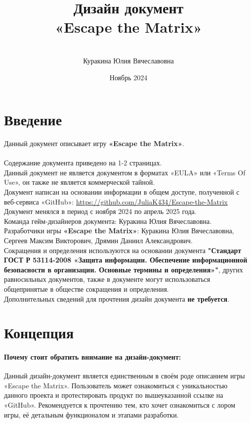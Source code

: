 \documentclass{article}
\title{Дизайн документ\\  «Escape the Matrix»}
\author{\\Куракина Юлия Вячеславовна}
\date{Ноябрь 2024}
\begin{document}
\maketitle

\tableofcontents 

\newpage
\section{Введение}

Данный документ описывает игру \textbf{«Escape the Matrix»}.\\ \\Содержание документа приведено на 1-2 страницах. \\Данный документ не является документом в форматах «EULA» или «Terms Of Use», он также не является коммерческой тайной. \\Документ написан на основании информации в общем доступе, полученной с веб-сервиса «GitHub»: \url{https://github.com/JuliaK434/Escape-the-Matrix} \\Документ менялся в период с ноября 2024 по апрель 2025 года.
\\Команда гейм-дизайнеров документа: Куракина Юлия Вячеславовна.\\Разработчики игры \textbf{«Escape the Matrix»}: Куракина Юлия Вячеславовна, Сергеев Максим Викторович, Дрямин Даниил Александрович. \\Сокращения и определения используются на основании документа \textbf{"Стандарт ГОСТ Р 53114-2008 «Защита информации. Обеспечение информационной безопасности в организации. Основные термины и определения»"}, других равносильных документов, также в документе могут использоваться общепринятые в обществе сокращения и определения. \\Дополнительных сведений для прочтения дизайн документа \textbf{не требуется}.

\newpage

\section{Концепция}

\paragraph{\textbf{Почему стоит обратить внимание на дизайн-документ:}}
Данный дизайн-документ является единственным в своём роде описанием игры «Escape the Matrix». Пользователь может ознакомиться с уникальностью данного проекта и протестировать продукт по вышеуказанной ссылке на «GitHub». Рекомендуется к прочтению тем, кто хочет ознакомиться с лором игры, её детальным функционалом и этапами разработки.
\end{document}
